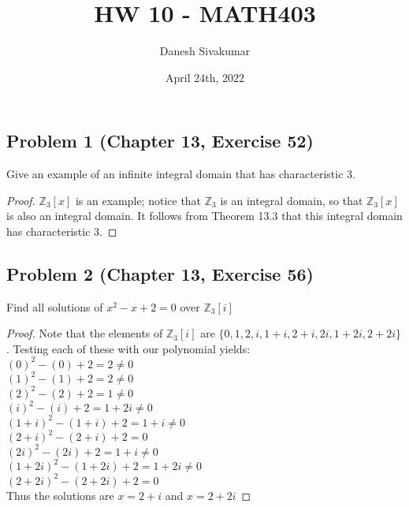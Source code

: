 \documentclass{article}
\title{HW 10 - MATH403}
\author{Danesh Sivakumar}
\date{April 24th, 2022}
\begin{document}
\maketitle 

\subsection*{Problem 1 (Chapter 13, Exercise 52)}
Give an example of an infinite integral domain that has characteristic 3.
\begin{proof}
$\mathbb{Z}_3[x]$ is an example; notice that $\mathbb{Z}_3$ is an integral domain, so that $\mathbb{Z}_3[x]$ is also an integral domain. It follows from Theorem 13.3 that this integral domain has characteristic 3.
\end{proof}


\subsection*{Problem 2 (Chapter 13, Exercise 56)}
Find all solutions of $x^2 - x + 2 = 0$ over $\mathbb{Z}_3[i]$
\begin{proof}
Note that the elements of $\mathbb{Z}_3[i]$ are $\{0, 1, 2, i, 1 + i, 2 + i, 2i, 1 + 2i, 2 + 2i\}$. Testing each of these with our polynomial yields: \\
$(0)^2 - (0) + 2 = 2 \neq 0$ \\  $(1)^2 - (1) + 2 = 2 \neq 0$ \\ $(2)^2 - (2) + 2 = 1 \neq 0$ \\ $(i)^2 - (i) + 2 = 1 + 2i \neq 0$ \\ $(1 + i)^2 - (1 + i) + 2 = 1 + i \neq 0$ \\ $(2 + i)^2 - (2 + i) + 2 = 0$ \\ $(2i)^2 - (2i) + 2 = 1 + i \neq 0$ \\ $(1 + 2i)^2 - (1 + 2i) + 2 = 1 + 2i \neq 0$ \\ $(2 + 2i)^2 - (2 + 2i) + 2 = 0$ \\
Thus the solutions are $x = 2 + i$ and $x = 2 + 2i$
\end{proof}
\end{document}
